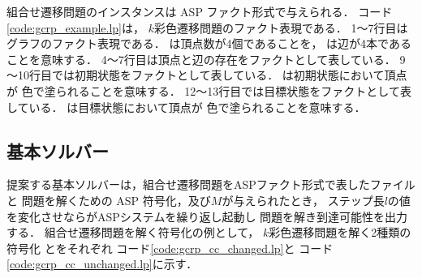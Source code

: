 組合せ遷移問題のインスタンスは ASP ファクト形式で与えられる．
コード\ref{code:gcrp_example.lp}は，
$k$彩色遷移問題のファクト表現である．
1～7行目はグラフのファクト表現である．
は頂点数が4個であることを，
は辺が4本であることを意味する．
4～7行目は頂点と辺の存在をファクトとして表している．
9～10行目では初期状態をファクトとして表している．
は初期状態において頂点が
色で塗られることを意味する．
12～13行目では目標状態をファクトとして表している．
は目標状態において頂点が
色で塗られることを意味する．



\subsection{基本ソルバー} \label{sec:based_solver}

提案する基本ソルバーは，組合せ遷移問題をASPファクト形式で表したファイルと
問題を解くための ASP 符号化，及び$M$が与えられたとき，
ステップ長$l$の値を変化させならがASPシステムを繰り返し起動し
問題を解き到達可能性を出力する．
組合せ遷移問題を解く符号化の例として，
$k$彩色遷移問題を解く2種類の符号化
とをそれぞれ
コード\ref{code:gcrp_cc_changed.lp}と
コード\ref{code:gcrp_cc_unchanged.lp}に示す．





